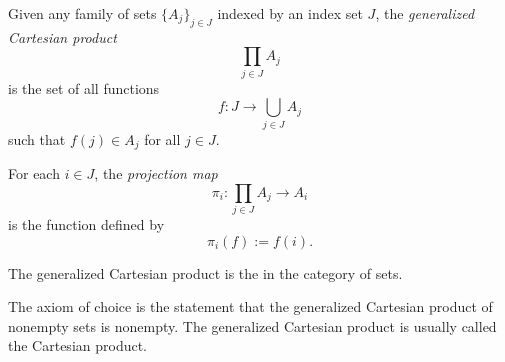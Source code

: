 \documentclass{article}
\begin{document}
Given any family of sets $\{A_j\}_{j \in J}$ indexed by an index set $J$, the \emph{generalized Cartesian product}
\[
\prod_{j \in J} A_j
\]
is the set of all functions
\[
f\colon J \to \bigcup_{j \in J} A_j
\]
such that $f(j) \in A_j$ for all $j \in J$.

For each $i \in J$, the \emph{projection map} 
\[
\pi_i\colon \prod_{j \in J} A_j \to A_i
\]
is the function defined by
\[
\pi_i(f) := f(i).
\]

The generalized Cartesian product is the  in the category of sets.

The axiom of choice is the statement that the generalized Cartesian product of nonempty sets is nonempty.
The generalized Cartesian product is usually called the Cartesian product.
\end{document}

